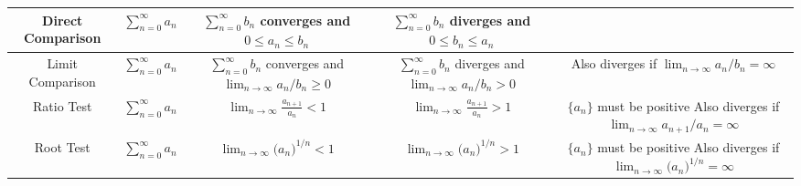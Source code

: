 \begin{tabular}{|c|c|c|c|c|}
Direct Comparison & \rule[-30pt]{0pt}{65pt}$\displaystyle{\sum^\infty_{n=0}{a_n}}$ & \parbox{1in}{\centering$\displaystyle \sum_{n=0}^\infty b_n $\\[3pt] converges and \\[3pt] $0\leq a_n\leq b_n$}%
& \parbox{1in}{\centering$\displaystyle \sum_{n=0}^\infty b_n $\\[3pt] diverges and \\[3pt] $0\leq b_n\leq a_n$} & \\ \hline

Limit Comparison & \rule[-30pt]{0pt}{65pt}$\displaystyle{\sum^\infty_{n=0}{a_n}}$ & \parbox{1.3in}{\centering$\displaystyle \sum_{n=0}^\infty b_n $\\[3pt] converges and \\[3pt] $\displaystyle \lim_{n\to\infty} a_n/b_n  \geq 0$}%
& \parbox{1in}{\centering$\displaystyle \sum_{n=0}^\infty b_n $\\[3pt] diverges and \\[3pt] $\displaystyle \lim_{n\to\infty} a_n/b_n > 0$}  & \parbox{1.5in}{\centering Also diverges if\\[3pt] $\displaystyle \lim_{n\to\infty} a_n/b_n=\infty$}\\ \hline

Ratio Test & \rule[-30pt]{0pt}{65pt}$\displaystyle{\sum^\infty_{n=0}{a_n}}$ &%
 \parbox{1.3in}{\centering$\displaystyle \lim_{n\to\infty} \frac{a_{n+1}}{a_n}  < 1$}%
& \parbox{1.3in}{\centering$\displaystyle \lim_{n\to\infty} \frac{a_{n+1}}{a_n} > 1$} & 
\parbox{1.5in}{\centering $\{a_n\}$ must be positive\\[3pt] Also diverges if\\[3pt] $\displaystyle \lim_{n\to\infty} a_{n+1}/a_n=\infty$}\\ \hline

Root Test & \rule[-30pt]{0pt}{65pt}$\displaystyle{\sum^\infty_{n=0}{a_n}}$ &%
 \parbox{1.3in}{\centering$\displaystyle \lim_{n\to\infty} \big(a_n\big)^{1/n}  < 1$}%
& \parbox{1.3in}{\centering$\displaystyle \lim_{n\to\infty} \big(a_n\big)^{1/n} > 1$} & 
\parbox{1.5in}{\centering $\{a_n\}$ must be positive\\[3pt] Also diverges if\\[3pt] $\displaystyle \lim_{n\to\infty} \big(a_n\big)^{1/n}=\infty$}\\ \hline

\end{tabular}


%
